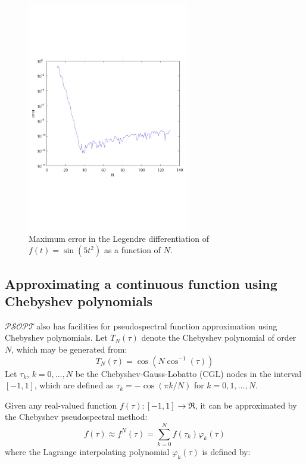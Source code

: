 \documentclass[a4paper,11pt]{report}    %
\newcommand{\psopt}{$\mathcal{PSOPT}$\,}  %
\begin{document}
\begin{figure}[htbp] 
 \centerline{\includegraphics[height=10cm]{derivatives_error}}
\caption{Maximum error in the Legendre differentiation of $f(t)=\sin(5t^2)$ as a function of $N$.}
\label{fig:diff_error} 
\end{figure}













\subsection{Approximating a continuous function using Chebyshev polynomials}


\psopt also has facilities for pseudospectral function approximation using Chebyshev polynomials. 
Let $T_N(\tau)$ denote the Chebyshev polynomial of order $N$,
which may be generated from:
\begin{equation}
  T_N(\tau) = \cos( N \cos^{-1} (\tau)  )
\end{equation}
 Let $\tau_k$, $k=0,\ldots,N$ be the Chebyshev-Gauss-Lobatto (CGL) nodes in the interval $[-1,1]$, 
which are defined as $\tau_{k} = -\cos(\pi k /N)$ for $k = 0,1,\ldots, N$.

Given any
real-valued function $f(\tau): [-1,1]\rightarrow \Re$, it can be approximated by the Chebyshev
pseudospectral method:
\begin{equation} \label{chebyshev_approx}
  f(\tau) \approx f^{N}(\tau) = \sum_{k=0}^{N} f(\tau_k) \varphi_k(\tau)
\end{equation}
where the Lagrange interpolating polynomial $\varphi_k(\tau)$ is defined by:
\end{document}

